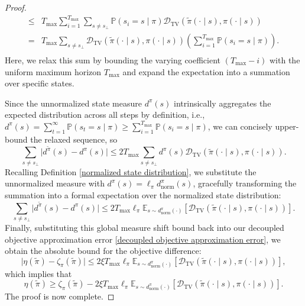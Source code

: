\documentclass{article}
\theoremstyle{plain}
\theoremstyle{definition}
\theoremstyle{remark}
\begin{document}
\begin{proof}
\begin{equation}
\begin{split}
			\leq& T_{\max} \sum_{i=1}^{T_{\max}} \sum_{s \neq s_\bot} \mathbb{P}(s_i = s \mid \pi) \mathcal{D}_{\mathrm{TV}}(\tilde{\pi}(\cdot \mid s), \pi(\cdot \mid s))\\
			=& T_{\max} \sum_{s \neq s_\bot} \mathcal{D}_{\mathrm{TV}}(\tilde{\pi}(\cdot \mid s), \pi(\cdot \mid s)) \left( \sum_{i=1}^{T_{\max}} \mathbb{P}(s_i = s \mid \pi) \right).\\
		\end{split}
	\end{equation}
	Here, we relax this sum by bounding the varying coefficient $(T_{\max} - i)$ with the uniform maximum horizon $T_{\max}$ and expand the expectation into a summation over specific states.
	
	Since the unnormalized state measure $d^\pi(s)$ intrinsically aggregates the expected distribution across all steps by definition, i.e., $d^\pi(s) = \sum_{t=1}^{\infty}\mathbb{P}(s_t = s \mid \pi) \geq \sum_{i=1}^{T_{\max}} \mathbb{P}(s_i = s \mid \pi)$, we can concisely upper-bound the relaxed sequence, so
	\begin{equation}
		\sum_{s \neq s_\bot} \lvert d^{\tilde{\pi}}(s) - d^\pi(s) \rvert \leq 2T_{\max} \sum_{s \neq s_\bot} d^\pi(s)\mathcal{D}_{\mathrm{TV}}(\tilde{\pi}(\cdot \mid s), \pi(\cdot \mid s)).
	\end{equation}
	Recalling Definition \ref{normalized state distribution}, we substitute the unnormalized measure with $d^\pi(s) = \ell_\pi d^\pi_{\mathrm{norm}}(s)$, gracefully transforming the summation into a formal expectation over the normalized state distribution:
	\begin{equation}
		\sum_{s \neq s_\bot} \lvert d^{\tilde{\pi}}(s) - d^\pi(s) \rvert \leq 2T_{\max}\ell_\pi\mathbb{E}_{s \sim d^{\pi}_{\mathrm{norm}}(\cdot)}\left[\mathcal{D}_{\mathrm{TV}}(\tilde{\pi}(\cdot \mid s),\pi(\cdot \mid s))\right].
	\end{equation}
	Finally, substituting this global measure shift bound back into our decoupled objective approximation error \eqref{decoupled objective approximation error}, we obtain the absolute bound for the objective difference:
	\begin{equation}
		\lvert \eta(\tilde{\pi}) - \zeta_\pi(\tilde{\pi}) \rvert \leq 2\xi T_{\max}\ell_\pi\mathbb{E}_{s \sim d^{\pi}_{\mathrm{norm}}(\cdot)}\left[\mathcal{D}_{\mathrm{TV}}(\tilde{\pi}(\cdot \mid s),\pi(\cdot \mid s))\right],
	\end{equation}
	which implies that
	\begin{equation}
		\eta(\tilde{\pi})\geq\zeta_\pi(\tilde{\pi}) - 2\xi T_{\max}\ell_\pi\mathbb{E}_{s \sim d^{\pi}_{\mathrm{norm}}(\cdot)}\left[\mathcal{D}_{\mathrm{TV}}(\tilde{\pi}(\cdot \mid s),\pi(\cdot \mid s))\right].
	\end{equation}
	The proof is now complete.
\end{proof}




\newpage

\end{document}
